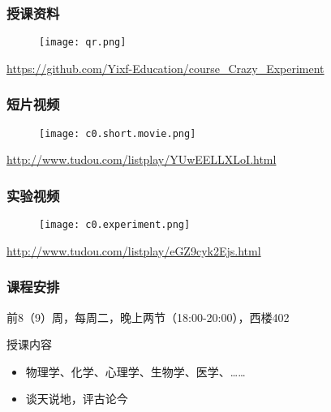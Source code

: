 \begin{frame}
  \frametitle{授课资料}
  \begin{figure}
    \centering
    \texttt{[image: qr.png]}
  \end{figure}
  \begin{center}
  \href{https://github.com/Yixf-Education/course_Crazy_Experiment}{https://github.com/Yixf-Education/course\_Crazy\_Experiment}
  \end{center}
\end{frame}

\begin{frame}
  \frametitle{短片视频}
  \begin{figure}
    \centering
    \texttt{[image: c0.short.movie.png]}
  \end{figure}
  \begin{center}
    \href{http://www.tudou.com/listplay/YUwEELLXLoI.html}{http://www.tudou.com/listplay/YUwEELLXLoI.html}
  \end{center}
\end{frame}

\begin{frame}
  \frametitle{实验视频}
  \begin{figure}
    \centering
    \texttt{[image: c0.experiment.png]}
  \end{figure}
  \begin{center}
    \href{http://www.tudou.com/listplay/eGZ9cyk2Ejs.html}{http://www.tudou.com/listplay/eGZ9cyk2Ejs.html}
  \end{center}
\end{frame}

\begin{frame}
  \frametitle{课程安排}
  \begin{center}
  \alert{前8（9）周，每周二，晚上两节（18:00-20:00），西楼402}\\
  \vspace{0.2cm}
  \end{center}
  \begin{block}{授课内容}
    \begin{itemize}
      \item 物理学、化学、心理学、生物学、医学、……
      \item 谈天说地，评古论今
    \end{itemize}
  \end{block}
\end{frame}

